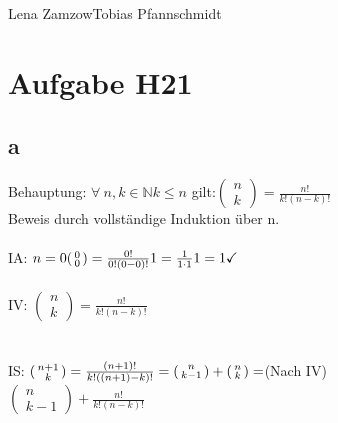 \documentclass[11pt,a4paper]{article}
\begin{document}
                {Lena Zamzow}{Tobias Pfannschmidt}{}{}{}


\section*{Aufgabe H21}
\subsection*{a}
Behauptung: $\forall~n,k \in \mathbb{N} k \leq n $ gilt:$ (
\begin{smallmatrix}
n\\k
\end{smallmatrix} ) = \frac{n!}{k!(n-k)!}$\\
Beweis durch vollständige Induktion über n.\\ \\
IA: $n=0\\
(
\begin{smallmatrix}
0\\0
\end{smallmatrix} ) = \frac{0!}{0!(0-0)!}\\
1=\frac{1}{1\cdot 1}\\
1=1 \checkmark$
\\ \\
IV: $(
\begin{smallmatrix}
	n\\k
\end{smallmatrix} ) = \frac{n!}{k!(n-k)!}$\\
\\ \\
IS: $(
\begin{smallmatrix}
n+1\\k
\end{smallmatrix} ) = 
\frac{(n+1)!}{k!((n+1)-k)!}\\= (
\begin{smallmatrix}
n\\k-1
\end{smallmatrix} ) + (
\begin{smallmatrix}
n\\k 
\end{smallmatrix} ) \\
= $(Nach IV)
\\
$(
\begin{smallmatrix}
	n\\k-1
\end{smallmatrix} ) + \frac{n!}{k!(n-k)!}$\\
\end{document}
